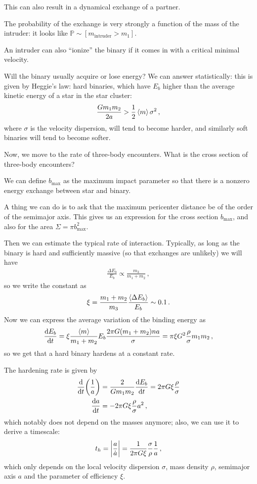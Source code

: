 \documentclass[main.tex]{subfiles}
\begin{document}
This can also result in a dynamical exchange of a partner. 

The probability of the exchange is very strongly a function of the mass of the intruder: it looks like \(\mathbb{P} \sim [m _{\text{intruder}} > m_1 ]\). 

An intruder can also ``ionize'' the binary if it comes in with a critical minimal velocity. 

Will the binary usually acquire or lose energy? 
We can answer statistically: this is given by Heggie's law: hard binaries, which have \(E_b\) higher than the average kinetic energy of a star in the star cluster: 
%
\begin{align}
\frac{G m_1 m_2 }{2a} > \frac{1}{2} \expval{m} \sigma^2
\,,
\end{align}
%
where \(\sigma \) is the velocity dispersion, will tend to become harder, and similarly soft binaries will tend to become softer. 

Now, we move to the rate of three-body encounters. 
What is the cross section of three-body encounters? 

We can define \(b _{\text{max}} \) as the maximum impact parameter so that there is a nonzero energy exchange between star and binary. 

A thing we can do is to ask that the maximum pericenter distance be of the order of the semimajor axis. 
This gives us an expression  for the cross section \(b _{\text{max}}\), and also for the area \(\Sigma = \pi b _{\text{max}}^2\). 

Then we can estimate the typical rate of interaction. 
Typically, as long as the binary is hard and sufficiently massive (so that exchanges are unlikely) we will have 
%
\begin{align}
\frac{ \Delta E_b}{E_b} \propto \frac{m_3}{m_1 + m_2 }
\,,
\end{align}
%
so we write the constant as 
%
\begin{align}
\xi = \frac{m_1 +m_2 }{m_3 } \frac{\expval{\Delta E_b}}{E_b} \sim \num{.1}
\,.
\end{align}
%
Now we can express the average variation of the binding energy as 
%
\begin{align}
\dv{E_b}{t} = \xi \frac{\expval{m}}{m_1 + m_2 } E_b \frac{2 \pi G (m_1 + m_2 ) na}{\sigma } = \pi \xi G^2 \frac{\rho}{\sigma } m_1 m_2 
\,,
\end{align}
%
so we get that a hard binary hardens at a constant rate. 

The hardening rate is given by 
%
\begin{align}
\dv{}{t} \qty(\frac{1}{a}) &= \frac{2}{G m_1 m_2 } \dv{E_b}{t} = 2 \pi G \xi \frac{\rho}{\sigma }  \\
\dv{a}{t} &= - 2 \pi G \xi \frac{\rho }{\sigma } a^2
\,,
\end{align}
%
which notably does not depend on the masses anymore; also, we can use it to derive a timescale: 
%
\begin{align}
t_{h} = \abs{\frac{a}{\dot{a}}} = \frac{1}{2 \pi G \xi } \frac{\sigma}{\rho } \frac{1}{a}
\,,
\end{align}
%
which only depends on the local velocity dispersion \(\sigma \), mass density \(\rho \), semimajor axis \(a\) and the parameter of efficiency \(\xi \). 
\end{document}
